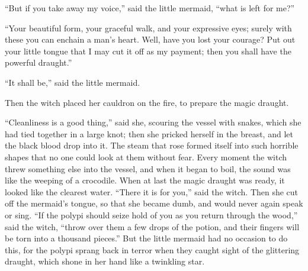 ``But if you take away my voice,'' said the little mermaid, ``what is left for me?''

``Your beautiful form, your graceful walk, and your expressive eyes; surely with these you can enchain a man’s heart.
Well, have you lost your courage? Put out your little tongue that I may cut it off as my payment; then you shall have the powerful draught.''

``It shall be,'' said the little mermaid.

Then the witch placed her cauldron on the fire, to prepare the magic draught.

``Cleanliness is a good thing,'' said she, scouring the vessel with snakes, which she had tied together in a large knot; then she pricked herself in the breast, and let the black blood drop into it.
The steam that rose formed itself into such horrible shapes that no one could look at them without fear.
Every moment the witch threw something else into the vessel, and when it began to boil, the sound was like the weeping of a crocodile.
When at last the magic draught was ready, it looked like the clearest water.
``There it is for you,'' said the witch.
Then she cut off the mermaid’s tongue, so that she became dumb, and would never again speak or sing.
``If the polypi should seize hold of you as you return through the wood,'' said the witch, ``throw over them a few drops of the potion, and their fingers will be torn into a thousand pieces.'' But the little mermaid had no occasion to do this, for the polypi sprang back in terror when they caught sight of the glittering draught, which shone in her hand like a twinkling star.

